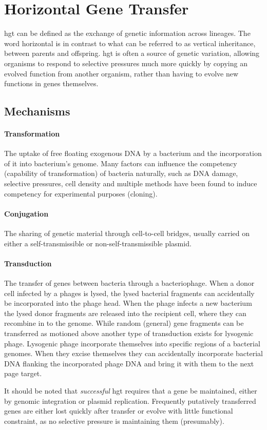 \documentclass[12pt,letter]{article}
\begin{document}
\section{Horizontal Gene Transfer}
\ac{hgt} can be defined as the exchange of genetic information across lineages\citep{lgt}.
The word horizontal is in contrast to what can be referred to as vertical inheritance, between parents and offspring\citep{ihgt}.
\ac{hgt} is often a source of genetic variation, allowing organisms to respond to selective pressures much more quickly by copying an evolved function from another organism, rather than having to evolve new functions in genes themselves\citep{ihgt,adaevo}.\par
\subsection{Mechanisms}
\paragraph{Transformation}
The uptake of free floating exogenous DNA by a bacterium and the incorporation of it into bacterium's genome\citep{lgt}.
Many factors can influence the competency (capability of transformation) of bacteria naturally, such as DNA damage, selective pressures, cell density and multiple methods have been found to induce competency for experimental purposes (cloning)\citep{natcomp}.
\paragraph{Conjugation}
The sharing of genetic material through cell-to-cell bridges, usually carried on either a self-transmissible or non-self-transmissible plasmid\citep{conjug}.
\paragraph{Transduction}
The transfer of genes between bacteria through a bacteriophage\citep{transd}.
When a donor cell infected by a phages is lysed, the lysed bacterial fragments can accidentally be incorporated into the phage head\citep{transd}.
When the phage infects a new bacterium the lysed donor fragments are released into the recipient cell, where they can recombine in to the genome\citep{transd}.
While random (general) gene fragments can be transferred as motioned above another type of transduction exists for lysogenic phage\citep{transd}.
Lysogenic phage incorporate themselves into specific regions of a bacterial genomes\citep{transd}.
When they excise themselves they can accidentally incorporate bacterial DNA flanking the incorporated phage DNA and bring it with them to the next page target\citep{transd}.\par
It should be noted that \textit{successful} \ac{hgt} requires that a gene be maintained, either by genomic integration or plasmid replication.
Frequently putatively transferred genes are either lost quickly after transfer or evolve with little functional constraint, as no selective pressure is maintaining them (presumably)\citep{fastlane}.
\end{document}
